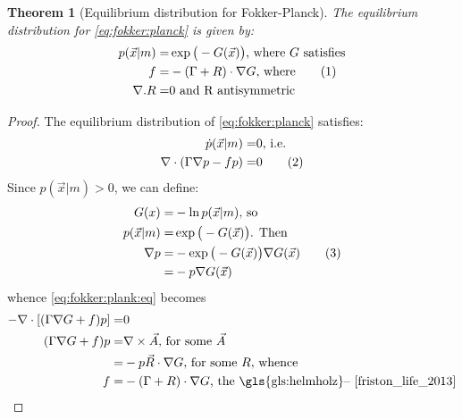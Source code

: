 \documentclass[]{article}
\newcommand\numberthis{\addtocounter{equation}{1}\tag{\theequation}}
\newtheorem{thm}{Theorem}
\begin{document}
\cite{friston_life_2013,friston2012free}

\begin{thm}[Equilibrium distribution for Fokker-Planck]
	The equilibrium distribution for \eqref{eq:fokker:planck} is given by:
	\begin{align*}
		p(\vec{x}\vert m) =& \exp \big(-G(\vec{x})\big) \text{, where $G$ satisfies}\\
		f =& -(\Gamma + R) \cdot \nabla G \text{, where} \numberthis \label{eq:f:Gamma:R}\\
		\nabla.R =& 0 \text{ and R antisymmetric}
	\end{align*}
	
\end{thm}
\begin{proof}
The equilibrium distribution of \eqref{eq:fokker:planck} satisfies:
	\begin{align*}
		\dot{p}(\vec{x}\vert m) =&0 \text{, i.e.}\\
		\nabla \cdot (\Gamma \nabla p -f p)=&0 \numberthis \label{eq:fokker:plank:eq}
	\end{align*}
	Since $	p(\vec{x}\vert m) > 0$, we can define:
	\begin{align*}
		G(x) =& - \ln{}p(\vec{x}\vert m) \text{, so}\\
		p(\vec{x}\vert m) =& \exp \big(-G(\vec{x})\big) \text{. Then}\\
		\nabla p =& - \exp \big(-G(\vec{x})\big) \nabla G(\vec{x}) \numberthis \label{eq:grad:p}\\
		=& - p \nabla G(\vec{x})
	\end{align*}
	 whence \eqref{eq:fokker:plank:eq} becomes
	\begin{align*}
		-\nabla \cdot [(\Gamma \nabla G +f)p]=&0\\
		(\Gamma \nabla G +f)p =& \nabla \times \vec{A} \text{, for some $\vec{A}$}\\
		=& -p \vec{R} \cdot \nabla G \text{, for some $R$, whence}\\
		f =& -(\Gamma + R) \cdot \nabla G \text{, the \gls{gls:helmholz}-- \cite[(2.3)]{friston_life_2013}}
	\end{align*}
\end{proof}
\end{document}
